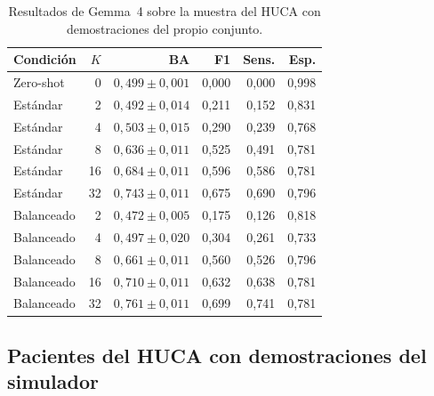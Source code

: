 \begin{table}[H]
  \centering
  \small
  \begin{tabular}{lrrrrr}
    \toprule
    Condición & \(K\) & BA & F1 & Sens. & Esp. \\
    \midrule
    Zero-shot & 0 & \(0,499 \pm 0,001\) & 0,000 & 0,000 & 0,998 \\
    Estándar & 2 & \(0,492 \pm 0,014\) & 0,211 & 0,152 & 0,831 \\
    Estándar & 4 & \(0,503 \pm 0,015\) & 0,290 & 0,239 & 0,768 \\
    Estándar & 8 & \(0,636 \pm 0,011\) & 0,525 & 0,491 & 0,781 \\
    Estándar & 16 & \(0,684 \pm 0,011\) & 0,596 & 0,586 & 0,781 \\
    Estándar & 32 & \(0,743 \pm 0,011\) & 0,675 & 0,690 & 0,796 \\
    Balanceado & 2 & \(0,472 \pm 0,005\) & 0,175 & 0,126 & 0,818 \\
    Balanceado & 4 & \(0,497 \pm 0,020\) & 0,304 & 0,261 & 0,733 \\
    Balanceado & 8 & \(0,661 \pm 0,011\) & 0,560 & 0,526 & 0,796 \\
    Balanceado & 16 & \(0,710 \pm 0,011\) & 0,632 & 0,638 & 0,781 \\
    Balanceado & 32 & \(0,761 \pm 0,011\) & 0,699 & 0,741 & 0,781 \\
    \bottomrule
  \end{tabular}
  \caption{Resultados de Gemma~4 sobre la muestra del HUCA con demostraciones del propio conjunto.}
  \label{tab:app_vlm_real_context}
  \resultstablenote
\end{table}

\subsection{Pacientes del HUCA con demostraciones del simulador}


